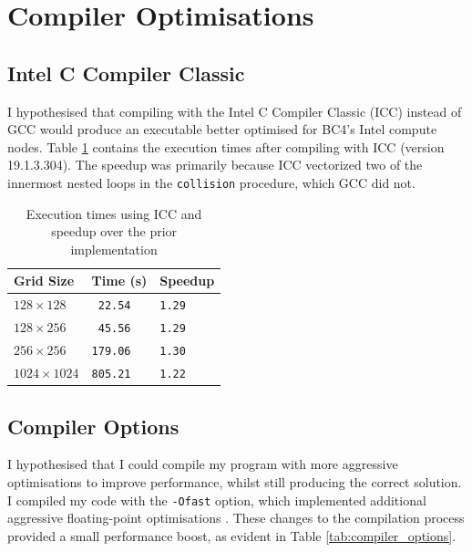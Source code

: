 \documentclass[twocolumn, a4paper]{article}
\begin{document}
\section{Compiler Optimisations}


\subsection{Intel C Compiler Classic}

I hypothesised that compiling with the Intel C Compiler Classic (ICC) instead of GCC would produce an executable better optimised for BC4's Intel compute nodes.
Table \ref{tab:icc} contains the execution times after compiling with ICC (version 19.1.3.304).
The speedup was primarily because ICC vectorized two of the innermost nested loops in the \texttt{collision} procedure, which GCC did not. 

\begin{table}[htbp]
  \begin{center}
  \caption{Execution times using ICC and speedup over the prior implementation}\label{tab:icc}
  \begin{tabular}[t]{l | l l} 
      \hline\hline
      Grid Size&Time (s)&Speedup\\
      \hline
      $128 \times 128$&\texttt{ 22.54}&\texttt{1.29}\\
      $128 \times 256$&\texttt{ 45.56}&\texttt{1.29}\\
      $256 \times 256$&\texttt{179.06}&\texttt{1.30}\\
      $1024 \times 1024$&\texttt{805.21}&\texttt{1.22}\\
      \hline
    \end{tabular}
  \end{center}
\end{table}

\subsection{Compiler Options}

I hypothesised that I could compile my program with more aggressive optimisations to improve performance, whilst still producing the correct solution.
I compiled my code with the \texttt{-Ofast} option, which implemented additional aggressive floating-point optimisations \cite{icc}.
These changes to the compilation process provided a small performance boost, as evident in Table \ref{tab:compiler_options}.
\end{document}
